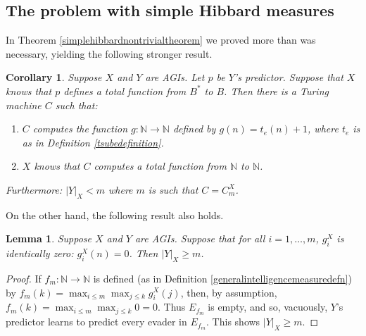 \documentclass{article}
\newtheorem{corollary}[theorem]{Corollary}
\newtheorem{lemma}[theorem]{Lemma}
\begin{document}
\subsection{The problem with simple Hibbard measures}
\label{problemwithsimplehibbardsection}

In Theorem \ref{simplehibbardnontrivialtheorem} we proved more than was necessary,
yielding the following stronger result.

\begin{corollary}
\label{technicalcorollaryaboutsimplehibbardmeasures}
    Suppose $X$ and $Y$ are AGIs. Let $p$ be $Y$'s predictor.
    Suppose that $X$ knows that $p$ defines a total function from
    $B^*$ to $B$.
    Then there is a Turing machine $C$ such that:
    \begin{enumerate}
        \item
        $C$ computes the function $g:\mathbb N\to \mathbb N$ defined by
        $g(n)=t_e(n)+1$, where $t_e$ is as in
        Definition \ref{tsubedefinition}.
        \item
        $X$ knows that $C$ computes a total function from $\mathbb N$ to $\mathbb N$.
    \end{enumerate}
    Furthermore: $|Y|_X<m$ where $m$ is such that $C=C^X_m$.
\end{corollary}

On the other hand, the following result also holds.

\begin{lemma}
\label{technicallemmaaboutsimplehibbardmeasures}
    Suppose $X$ and $Y$ are AGIs. Suppose that for all $i=1,\ldots,m$,
    $g^X_i$ is identically zero: $g^X_i(n)=0$.
    Then $|Y|_X\geq m$.
\end{lemma}

\begin{proof}
    If $f_m:\mathbb N\to\mathbb N$
    is defined (as in Definition \ref{generalintelligencemeasuredefn})
    by $f_m(k)=\max_{i\leq m}\max_{j\leq k}g^X_i(j)$, then, by
    assumption, $f_m(k)=\max_{i\leq m}\max_{j\leq k}0=0$.
    Thus $E_{f_m}$ is empty, and so, vacuously, $Y$'s predictor learns
    to predict every evader in $E_{f_m}$. This shows $|Y|_X\geq m$.
\end{proof}
\end{document}
